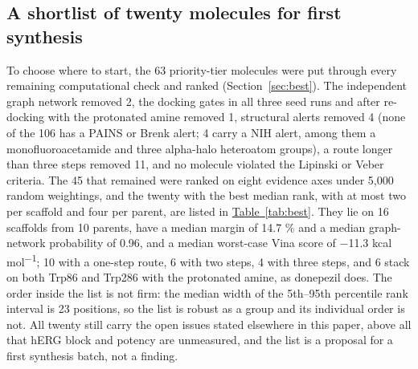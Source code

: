 \documentclass[11pt,a4paper]{article}
\begin{document}
\subsection{A shortlist of twenty molecules for first synthesis}
\label{sec:shortlist}

To choose where to start, the 63 priority-tier molecules were put through every remaining computational check and ranked (Section~\ref{sec:best}). The independent graph network removed 2, the docking gates in all three seed runs and after re-docking with the protonated amine removed 1, structural alerts removed 4 (none of the 106 has a PAINS or Brenk alert; 4 carry a NIH alert, among them a monofluoroacetamide and three alpha-halo heteroatom groups), a route longer than three steps removed 11, and no molecule violated the Lipinski or Veber criteria. The 45 that remained were ranked on eight evidence axes under 5,000 random weightings, and the twenty with the best median rank, with at most two per scaffold and four per parent, are listed in \hyperref[tab:best]{Table~\ref{tab:best}}. They lie on 16 scaffolds from 10 parents, have a median margin of 14.7 \% and a median graph-network probability of 0.96, and a median worst-case Vina score of $-$11.3 kcal mol\textsuperscript{$-$1}; 10 with a one-step route, 6 with two steps, 4 with three steps, and 6 stack on both Trp86 and Trp286 with the protonated amine, as donepezil does. The order inside the list is not firm: the median width of the 5th--95th percentile rank interval is 23 positions, so the list is robust as a group and its individual order is not. All twenty still carry the open issues stated elsewhere in this paper, above all that hERG block and potency are unmeasured, and the list is a proposal for a first synthesis batch, not a finding.
\end{document}
